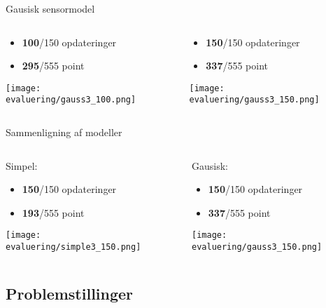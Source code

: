\begin{frame}[fragile]{Gausisk sensormodel}
	\begin{columns}
		\begin{column}{0.5\textwidth}
			\begin{itemize}
			\item \textbf{100}/150 opdateringer
			\item \textbf{295}/555 point
			\end{itemize}
			\texttt{[image: evaluering/gauss3\_100.png]}
		\end{column}
		\begin{column}{0.5\textwidth}
			\begin{itemize}
			\item \textbf{150}/150 opdateringer
			\item \textbf{337}/555 point
			\end{itemize}
			\texttt{[image: evaluering/gauss3\_150.png]}
		\end{column}
\end{columns}
\end{frame}

\begin{frame}[fragile]{Sammenligning af modeller}
	\begin{columns}
		\begin{column}{0.5\textwidth}
			Simpel:
			\begin{itemize}
			\item \textbf{150}/150 opdateringer
			\item \textbf{193}/555 point
			\end{itemize}
			\texttt{[image: evaluering/simple3\_150.png]}
		\end{column}
		\begin{column}{0.5\textwidth}
			Gausisk:
			\begin{itemize}
			\item \textbf{150}/150 opdateringer
			\item \textbf{337}/555 point
			\end{itemize}
			\texttt{[image: evaluering/gauss3\_150.png]}
		\end{column}
\end{columns}
\end{frame}

\subsection{Problemstillinger}


